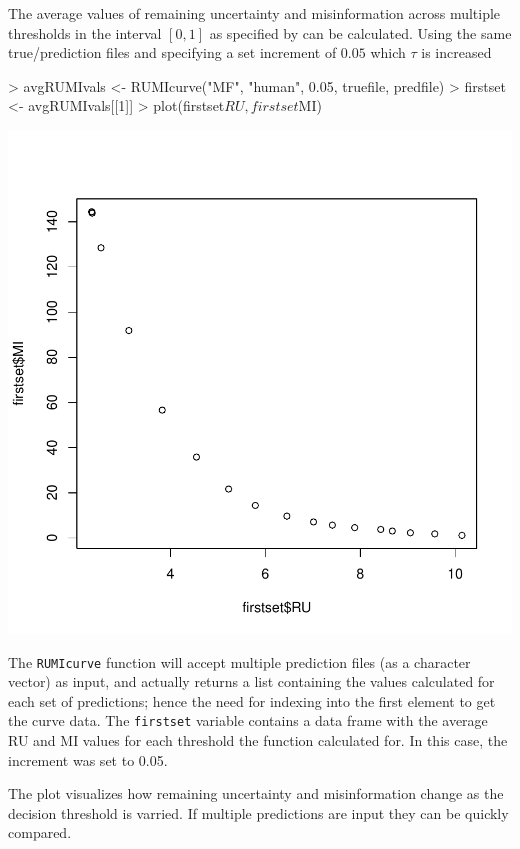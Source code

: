 \documentclass{article}
\begin{document}
The average values of remaining uncertainty and misinformation across multiple thresholds in the interval $[0,1]$ as specified by  can be calculated. Using the same true/prediction files and specifying a set increment of $0.05$ which $\tau$ is increased

\begin{Schunk}
\begin{Sinput}
> avgRUMIvals <- RUMIcurve("MF", "human", 0.05, truefile, predfile)
> firstset <- avgRUMIvals[[1]]
> plot(firstset$RU, firstset$MI)
\end{Sinput}
\end{Schunk}
\includegraphics{introduction-010}


The \texttt{RUMIcurve} function will accept multiple prediction files (as a character vector) as input, and actually returns a list containing the values calculated for each set of predictions; hence the need for indexing into the first element to get the curve data. The \texttt{firstset} variable contains a data frame with the average RU and MI values for each threshold the function calculated for. In this case, the increment was set to 0.05.

The plot visualizes how remaining uncertainty and misinformation change as the decision threshold is varried. If multiple predictions are input they can be quickly compared.
\end{document}
